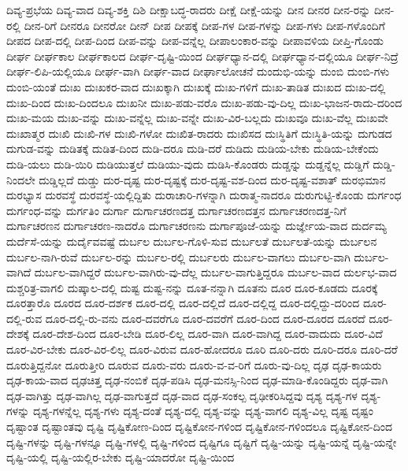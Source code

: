 {ದಿವ್ಯ-ಪ್ರಭೆಯ
ದಿವ್ಯ-ವಾದ
ದಿವ್ಯ-ಶಕ್ತಿ
ದಿಶಿ
ದೀಕ್ಷಾಬದ್ಧ-ರಾದರು
ದೀಕ್ಷೆ
ದೀಕ್ಷೆ-ಯನ್ನು
ದೀನ
ದೀನರ
ದೀನ-ರನ್ನು
ದೀನ-ರಲ್ಲಿ
ದೀನ-ರಿಗೆ
ದೀನರೂ
ದೀನರೋ
ದೀನ್
ದೀಪ
ದೀಪಕ್ಕೆ
ದೀಪ-ಗಳ
ದೀಪ-ಗಳನ್ನು
ದೀಪ-ಗಳು
ದೀಪ-ಗಳೊಂದಿಗೆ
ದೀಪದ
ದೀಪ-ದಲ್ಲಿ
ದೀಪ-ದಿಂದ
ದೀಪ-ವನ್ನು
ದೀಪ-ವನ್ನೆಲ್ಲ
ದೀಪಾಲಂಕಾರ-ವನ್ನು
ದೀಪಾವಳಿಯ
ದೀಪ್ತಿ-ಗೊಂಡು
ದೀರ್ಘ
ದೀರ್ಘಕಾಲ
ದೀರ್ಘಕಾಲದ
ದೀರ್ಘ-ದೃಷ್ಟಿ-ಯಿಂದ
ದೀರ್ಘಧ್ಯಾನ-ದಲ್ಲಿ
ದೀರ್ಘಧ್ಯಾನ-ದಲ್ಲಿಯೂ
ದೀರ್ಘ-ನಿದ್ರೆ
ದೀರ್ಘ-ಲಿಪಿ-ಯಲ್ಲಿಯೂ
ದೀರ್ಘ-ವಾಗಿ
ದೀರ್ಘ-ವಾದ
ದೀರ್ಘಾಲೋಚನೆ
ದುಂದುಭಿ-ಯನ್ನು
ದುಂಬಿ
ದುಂಬಿ-ಗಳು
ದುಂಬಿ-ಯಂತೆ
ದುಃಖ
ದುಃಖಕರ-ವಾದ
ದುಃಖಕ್ಕಾಗಿ
ದುಃಖಕ್ಕೆ
ದುಃಖ-ಗಳಿಗೆ
ದುಃಖ-ತಾಡಿತ
ದುಃಖದ
ದುಃಖ-ದಲ್ಲಿ
ದುಃಖ-ದಿಂದ
ದುಃಖ-ದಿಂದಲೂ
ದುಃಖನೀ
ದುಃಖ-ಪಡು-ವರೊ
ದುಃಖ-ಪಡು-ವು-ದಿಲ್ಲ
ದುಃಖ-ಭಾಜನ-ರಾದು-ದರಿಂದ
ದುಃಖ-ಮಯ
ದುಃಖ-ವನ್ನು
ದುಃಖ-ವನ್ನೆಲ್ಲ
ದುಃಖ-ವನ್ನೇ
ದುಃಖ-ವಿರ-ಬಲ್ಲದು
ದುಃಖವೂ
ದುಃಖ-ವೆಲ್ಲ
ದುಃಖವೇ
ದುಃಖಾತ್ಮರ
ದುಃಖಿ
ದುಃಖಿ-ಗಳ
ದುಃಖಿ-ಗಳೋ
ದುಃಖಿತ-ರಾದರು
ದುಃಖಿಸದ
ದುಃಸ್ಥಿತಿಗೆ
ದುಃಸ್ಥಿತಿ-ಯನ್ನು
ದುಗುಡದ
ದುಗುಡ-ವನ್ನು
ದುಡಿತಕ್ಕೆ
ದುಡಿತ-ದಿಂದ
ದುಡಿ-ದರೂ
ದುಡಿ-ದರೆ
ದುಡಿದು
ದುಡಿಯ-ಬೇಕು
ದುಡಿಯ-ಬೇಕೆಂದು
ದುಡಿ-ಯಲು
ದುಡಿ-ಯಿರಿ
ದುಡಿಯುತ್ತಲೆ
ದುಡಿಯು-ವುದು
ದುಡಿಸಿ-ಕೊಂಡರು
ದುಡ್ಡನ್ನು
ದುಡ್ಡನ್ನೆಲ್ಲ
ದುಡ್ಡಿಗೆ
ದುಡ್ಡಿ-ನಿಂದಲೇ
ದುಡ್ಡಿಲ್ಲದೆ
ದುಡ್ಡು
ದುರ-ದೃಷ್ಟ
ದುರ-ದೃಷ್ಟಕ್ಕೆ
ದುರ-ದೃಷ್ಟ-ವಶ-ದಿಂದ
ದುರ-ದೃಷ್ಟ-ವಶಾತ್
ದುರಭಿಮಾನ
ದುರಭ್ಯಾಸ
ದುರವಸ್ಥೆ
ದುರವಸ್ಥೆ-ಯಲ್ಲಿದ್ದಿತು
ದುರಾಚಾರಿ-ಗಳನ್ನಾಗಿ
ದುರಾತ್ಮ-ನಾದರೂ
ದುರುಗುಟ್ಟಿ-ಕೊಂಡು
ದುರ್ಗಂಧ
ದುರ್ಗಂಧ-ವನ್ನು
ದುರ್ಗತಿಂ
ದುರ್ಗಾ
ದುರ್ಗಾಚರಣದತ್ತ
ದುರ್ಗಾಚರಣದತ್ತನ
ದುರ್ಗಾಚರಣದತ್ತ-ನಿಗೆ
ದುರ್ಗಾಚರಣನ
ದುರ್ಗಾಚರಣ-ನಾದರೊ
ದುರ್ಗಾಚರಣನು
ದುರ್ಗಾಪೂಜೆ-ಯನ್ನು
ದುರ್ಜ್ಞೇಯ-ವಾದ
ದುರ್ದಮ್ಯ
ದುರ್ದೆಸೆ-ಯನ್ನು
ದುರ್ದೈವವಷ್ಟೆ
ದುರ್ಬಲ
ದುರ್ಬಲ-ಗೊಳಿ-ಸುವ
ದುರ್ಬಲತೆ
ದುರ್ಬಲತೆ-ಯನ್ನು
ದುರ್ಬಲನ
ದುರ್ಬಲ-ನಾಗಿ-ರುವೆ
ದುರ್ಬಲ-ರನ್ನು
ದುರ್ಬಲ-ರಲ್ಲಿ
ದುರ್ಬಲರು
ದುರ್ಬಲ-ವಾಗಲು
ದುರ್ಬಲ-ವಾಗಿ
ದುರ್ಬಲ-ವಾಗಿದೆ
ದುರ್ಬಲ-ವಾಗಿದ್ದರೆ
ದುರ್ಬಲ-ವಾಗಿರು-ವು-ದೆಲ್ಲ
ದುರ್ಬಲ-ವಾಗುತ್ತಿದ್ದರೂ
ದುರ್ಬಲ-ವಾದ
ದುರ್ಲಭ-ವಾದ
ದುಶ್ಚರಿತ್ರ-ವಾಗಲಿ
ದುಷ್ಕಾಲ-ದಲ್ಲಿ
ದುಷ್ಟ
ದುಷ್ಟ-ನನ್ನು
ದೂತ-ನನ್ನಾಗಿ
ದೂತನು
ದೂರ
ದೂರ-ಕೂಡದು
ದೂರಕ್ಕೆ
ದೂರತ್ತಾರೊ
ದೂರದ
ದೂರ-ದರ್ಶಕ
ದೂರ-ದಲ್ಲಿ
ದೂರ-ದಲ್ಲಿದೆ
ದೂರ-ದಲ್ಲಿದ್ದ
ದೂರ-ದಲ್ಲಿದ್ದು-ದರಿಂದ
ದೂರ-ದಲ್ಲಿ-ರುವ
ದೂರ-ದಲ್ಲಿ-ರು-ವನು
ದೂರ-ದವರೆಗೂ
ದೂರ-ದವರೆಗೆ
ದೂರ-ದಿಂದ
ದೂರ-ದೂರದ
ದೂರದೆ
ದೂರ-ದೇಶಕ್ಕೆ
ದೂರ-ದೇಶ-ದಿಂದ
ದೂರ-ಬೇಡಿ
ದೂರ-ಲಿಲ್ಲ
ದೂರ-ವಾಗಿ
ದೂರ-ವಾಗಿದ್ದ
ದೂರ-ವಾದುದು
ದೂರ-ವಿದೆ
ದೂರ-ವಿರ-ಬೇಕು
ದೂರ-ವಿರ-ಲಿಲ್ಲ
ದೂರ-ವಿರುವ
ದೂರ-ಹೋದರೂ
ದೂರಿ
ದೂರಿ-ದರು
ದೂರಿ-ದರೂ
ದೂರಿ-ದರೆ
ದೂರುತ್ತಿದ್ದನೋ
ದೂರುತ್ತೀರಿ
ದೂರುವ
ದೂರು-ವರು
ದೂರು-ವ-ವ-ರಿಗೆ
ದೂರು-ವು-ದಿಲ್ಲ
ದೃಢ
ದೃಢ-ಕಾಯರು
ದೃಢ-ಕಾಯ-ವಾದ
ದೃಢಚಿತ್ತ
ದೃಢ-ನಂಬಿಕೆ
ದೃಢ-ಪಡಿಸಿ
ದೃಢ-ಮನಸ್ಸಿ-ನಿಂದ
ದೃಢ-ಮಾಡಿ-ಕೊಂಡಿದ್ದರು
ದೃಢ-ವಾಗಿ
ದೃಢ-ವಾಗಿತ್ತು
ದೃಢ-ವಾಗಿಲ್ಲ
ದೃಢ-ವಾಗುತ್ತದೆ
ದೃಢ-ವಾದ
ದೃಢ-ಸಂಕಲ್ಪ
ದೃಢೀಕರಿಸಿದ್ದವು
ದೃಶ್ಯ
ದೃಶ್ಯ-ಗಳ
ದೃಶ್ಯ-ಗಳನ್ನು
ದೃಶ್ಯ-ಗಳನ್ನೆಲ್ಲ
ದೃಶ್ಯ-ಗಳು
ದೃಶ್ಯ-ದಂತೆ
ದೃಶ್ಯ-ದಲ್ಲಿ
ದೃಶ್ಯ-ವನ್ನು
ದೃಶ್ಯ-ವಾಗಲಿ
ದೃಶ್ಯ-ವಿಲ್ಲ
ದೃಷ್ಟ
ದೃಷ್ಟಂ
ದೃಷ್ಟಾಂತ
ದೃಷ್ಟಾಂತವು
ದೃಷ್ಟಿ
ದೃಷ್ಟಿಕೋಣ-ದಿಂದ
ದೃಷ್ಟಿಕೋನ-ಗಳಿಂದ
ದೃಷ್ಟಿಕೋನ-ಗಳಿಂದಲೂ
ದೃಷ್ಟಿಕೋನ-ದಿಂದ
ದೃಷ್ಟಿ-ಗಳನ್ನು
ದೃಷ್ಟಿ-ಗಳನ್ನೂ
ದೃಷ್ಟಿ-ಗಳಲ್ಲಿ
ದೃಷ್ಟಿ-ಗಳಿಂದ
ದೃಷ್ಟಿಗೂ
ದೃಷ್ಟಿಗೆ
ದೃಷ್ಟಿ-ಯನ್ನು
ದೃಷ್ಟಿ-ಯನ್ನೆ
ದೃಷ್ಟಿ-ಯನ್ನೇ
ದೃಷ್ಟಿ-ಯಲ್ಲಿ
ದೃಷ್ಟಿ-ಯಲ್ಲಿರ-ಬೇಕು
ದೃಷ್ಟಿ-ಯಾದರೋ
ದೃಷ್ಟಿ-ಯಿಂದ
}
